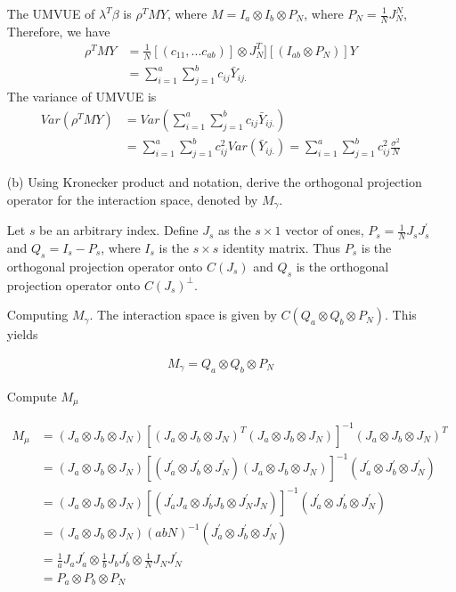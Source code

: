 \begin{itemize}
    The UMVUE of $\lambda^T \beta$ is $\rho^T MY$, where $M= I_a \otimes I_b \otimes P_N$, where $P_N = \frac{1}{N} J_{N}^{N} $,  
    Therefore, we have
 \begin{align*}
    \rho^T MY &= \frac{1}{N} [(c_{11}, ... c_{ab})]\otimes J_N^T] [(I_{ab} \otimes P_N)] Y\\
    & = \sum_{i=1}^{a} \sum_{j=1}^{b} c_{ij}\bar{Y}_{ij.}
 \end{align*}
    The variance of UMVUE is
 \begin{align*}
    Var(\rho^T MY) &= Var(\sum_{i=1}^{a} \sum_{j=1}^{b} c_{ij}\bar{Y}_{ij.}) \\
    &=\sum_{i=1}^{a} \sum_{j=1}^{b} c_{ij}^2Var(\bar{Y}_{ij.}) = \sum_{i=1}^{a} \sum_{j=1}^{b} c_{ij}^2 \frac{\sigma^2}{N}
 \end{align*}
    
    \item[(b)] Using Kronecker product and notation, derive the orthogonal projection operator for the interaction space, denoted by $M_{\gamma}$.
    
    Let $s$ be an arbitrary index. Define $J_s$ as the $s \times 1$ vector of ones, $P_s = \frac{1}{N} J_s J_s^{'}$ and $Q_s = I_s -P_s$, where $I_s$ is the $s \times s$ identity matrix. Thus $P_s$ is the orthogonal projection operator onto $C(J_s)$ and $Q_s$ is the orthogonal projection operator onto $C(J_s)^{\perp}$. 
      
    Computing $M_\gamma$. The interaction space is given by $C(Q_a \otimes Q_b \otimes P_N)$. This yields
    
 \begin{align*}
    M_\gamma = Q_a \otimes Q_b \otimes P_N
 \end{align*}
 
    Compute $M_\mu$
    
 \begin{align*}
    M_\mu &= (J_a \otimes J_b \otimes J_N) [(J_a \otimes J_b \otimes J_N)^{T}(J_a \otimes J_b \otimes J_N)]^{-1} (J_a \otimes J_b \otimes J_N)^{T}\\
     &= (J_a \otimes J_b \otimes J_N) [(J_a ^{'}\otimes J_b^{'} \otimes J_N^{'})(J_a \otimes J_b \otimes J_N)]^{-1} (J_a^{'} \otimes J_b^{'} \otimes J_N^{'})\\
     &= (J_a \otimes J_b \otimes J_N) [(J_a ^{'}J_a\otimes J_b^{'}J_b \otimes J_N^{'}J_N)]^{-1}(J_a^{'} \otimes J_b^{'} \otimes J_N^{'})\\
     &= (J_a \otimes J_b \otimes J_N) (abN)^{-1} (J_a^{'} \otimes J_b^{'} \otimes J_N^{'})\\
     &= \frac{1}{a}J_aJ_a^{'} \otimes \frac{1}{b}J_bJ_b^{'} \otimes \frac{1}{N}J_NJ_N^{'} \\
     &= P_a \otimes P_b \otimes P_N
 \end{align*}
    

\end{itemize}

